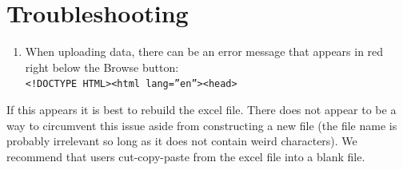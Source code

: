 \documentclass[
  openany]{book}
\providecommand{\tightlist}{%
  \setlength{\itemsep}{0pt}\setlength{\parskip}{0pt}}
\begin{document}
\hypertarget{ft-trbl}{%
\section{Troubleshooting}\label{ft-trbl}}

\begin{enumerate}
\def\labelenumi{\arabic{enumi}.}
\tightlist
\item
  When uploading data, there can be an error message that appears in red right below the Browse button:\\
  \texttt{\textless{}!DOCTYPE\ HTML\textgreater{}\textless{}html\ lang=”en”\textgreater{}\textless{}head\textgreater{}}
\end{enumerate}

If this appears it is best to rebuild the excel file. There does not appear to be a way to circumvent this issue aside from constructing a new file (the file name is probably irrelevant so long as it does not contain weird characters). We recommend that users cut-copy-paste from the excel file into a blank file.

\printbibliography
\end{document}
